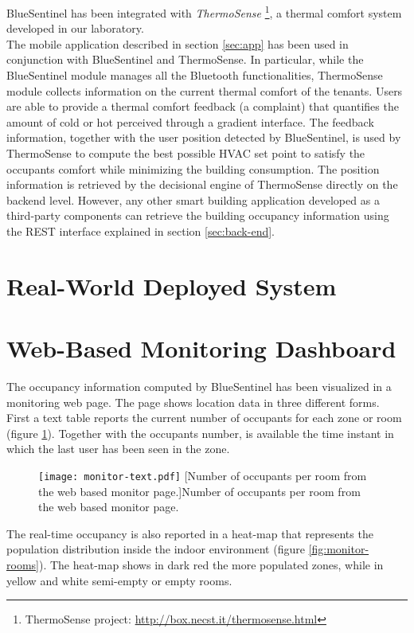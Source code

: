 BlueSentinel has been integrated with \emph{ThermoSense}
\footnote{ThermoSense project: \url{http://box.necst.it/thermosense.html}}, a thermal comfort system developed in our laboratory.\\
The mobile application described in section \ref{sec:app} has been used in conjunction with BlueSentinel and ThermoSense. In particular, while the BlueSentinel module manages all the Bluetooth functionalities, ThermoSense module collects information on the current thermal comfort of the tenants. Users are able to provide a thermal comfort feedback (a complaint) that quantifies the amount of cold or hot perceived through a gradient interface. The feedback information, together with the user position detected by BlueSentinel, is used by ThermoSense to compute the best possible HVAC set point to satisfy the occupants comfort while minimizing the building consumption.
The position information is retrieved by the decisional engine of ThermoSense directly on the backend level. However, any other smart building application developed as a third-party components can retrieve the building occupancy information using the REST interface explained in section \ref{sec:back-end}.


\section{Real-World Deployed System}
\label{sec:lab}

\section{Web-Based Monitoring Dashboard}
\label{sec:webmonitor}
The occupancy information computed by BlueSentinel has been visualized in a monitoring web page. The page shows location data in three different forms.\\
First a text table reports the current number of occupants for each zone or room (figure \ref{fig:monitor-text}). Together with the occupants number, is available the time instant in which the last user has been seen in the zone.

\begin{figure}[h!tb]
\center
\texttt{[image: monitor-text.pdf]}
[Number of occupants per room from the web based monitor page.]{Number of occupants per room from the web based monitor page.}
\label{fig:monitor-text}
\end{figure}

The real-time occupancy is also reported in a heat-map that represents the population distribution inside the indoor environment (figure \ref{fig:monitor-rooms}). The heat-map shows in dark red the more populated zones, while in yellow and white semi-empty or empty rooms.

